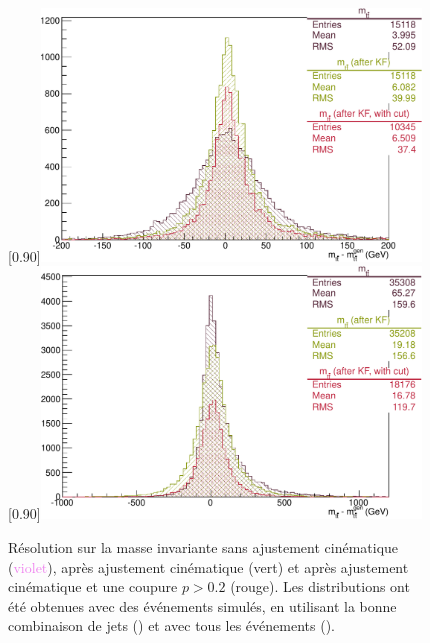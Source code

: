 \bigskip

\begin{figure}[p] \centering
    \subcaptionbox{\label{fig:kinfit_matched_events}}[0.90\textwidth]{\includegraphics[width=0.90\textwidth]{chapitre6/figs/kinfit/mtt_resolution_with_kinfit_2011_resolutions_good_solutions_on_TTbar.pdf}} \\
    \subcaptionbox{\label{fig:kinfit_all_events}}[0.90\textwidth]{\includegraphics[width=0.90\textwidth]{chapitre6/figs/kinfit/mtt_resolution_with_kinfit_2011_resolutions_on_TTbar.pdf}}
    \caption{Résolution sur la masse invariante \mtt sans ajustement cinématique (\textcolor{violet}{violet}), après ajustement cinématique (\textcolor{vert}{vert}) et après ajustement cinématique et une coupure $p > 0.2$ (\textcolor{rouge_grandmere}{rouge}). Les distributions ont été obtenues avec des événements \ttbar simulés, en utilisant la bonne combinaison de jets () et avec tous les événements ().}
    \label{fig:kinfit_ttbar}
\end{figure}

